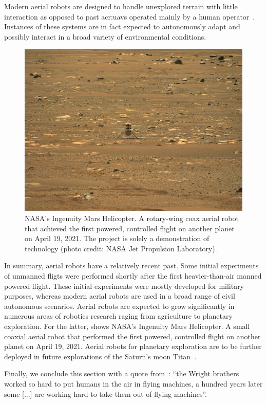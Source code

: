 Modern aerial robots are designed to handle unexplored terrain with little interaction as opposed to past \Gls{acr:uav}s operated mainly by a human operator~\citep{siciliano2016springer}. Instances of these systems are in fact expected to autonomously adapt and possibly interact in a broad variety of environmental conditions. 

\begin{figure}[t]
  \centering
  \includegraphics[width=.7\textwidth]{pictures/jpegPIA24550}
  \caption[NASA's Ingenuity Mars Helicopter]{NASA's Ingenuity Mars Helicopter. A rotary-wing coax aerial robot that achieved the first powered, controlled flight on another planet on April 19, 2021. The project is solely a demonstration of technology {\scriptsize(photo credit: NASA Jet Propulsion Laboratory)}.}   
  \label{fig:ingenuity}
\end{figure}

In summary, aerial robots have a relatively recent past. Some initial experiments of unmanned fligts were performed shortly after the first heavier-than-air manned powered flight. These initial experiments were mostly developed for military purposes, whereas modern aerial robots are used in a broad range of civil autonomous scenarios. Aerial robots are expected to grow significantly in numerous areas of robotics research raging from agriculture to planetary exploration. For the latter,  shows NASA's Ingenuity Mars Helicopter. A small coaxial aerial robot that performed the first powered, controlled flight on another planet on April 19, 2021. Aerial robots for planetary exploration are to be further deployed in future explorations of the Saturn's moon Titan~\citep{voosen2019nasa}.

Finally, we conclude this section with a quote from~\citep{anderson2005introduction}: ``the Wright brothers worked so hard to put humans in the air in flying machines, a hundred years later some [...] are working hard to take them out of flying machines''.


